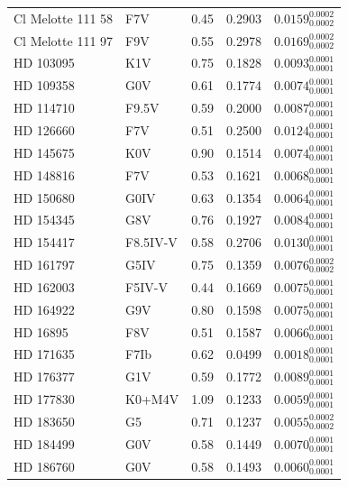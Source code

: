 \begin{appendices}
\begin{longtable}{llccc}
Cl Melotte 111 58 & F7V           & 0.45 & 0.2903        & $0.0159^{0.0002}_{0.0002}$ \\
Cl Melotte 111 97 & F9V           & 0.55 & 0.2978        & $0.0169^{0.0002}_{0.0002}$ \\
HD 103095         & K1V           & 0.75 & 0.1828        & $0.0093^{0.0001}_{0.0001}$ \\
HD 109358         & G0V           & 0.61 & 0.1774        & $0.0074^{0.0001}_{0.0001}$ \\
HD 114710         & F9.5V         & 0.59 & 0.2000        & $0.0087^{0.0001}_{0.0001}$ \\
HD 126660         & F7V           & 0.51 & 0.2500        & $0.0124^{0.0001}_{0.0001}$ \\
HD 145675         & K0V           & 0.90 & 0.1514        & $0.0074^{0.0001}_{0.0001}$ \\
HD 148816         & F7V           & 0.53 & 0.1621        & $0.0068^{0.0001}_{0.0001}$ \\
HD 150680         & G0IV          & 0.63 & 0.1354        & $0.0064^{0.0001}_{0.0001}$ \\
HD 154345         & G8V           & 0.76 & 0.1927        & $0.0084^{0.0001}_{0.0001}$ \\
HD 154417         & F8.5IV-V      & 0.58 & 0.2706        & $0.0130^{0.0001}_{0.0001}$ \\
HD 161797         & G5IV          & 0.75 & 0.1359        & $0.0076^{0.0002}_{0.0002}$ \\
HD 162003         & F5IV-V        & 0.44 & 0.1669        & $0.0075^{0.0001}_{0.0001}$ \\
HD 164922         & G9V           & 0.80 & 0.1598        & $0.0075^{0.0001}_{0.0001}$ \\
HD 16895          & F8V           & 0.51 & 0.1587        & $0.0066^{0.0001}_{0.0001}$ \\
HD 171635         & F7Ib          & 0.62 & 0.0499        & $0.0018^{0.0001}_{0.0001}$ \\
HD 176377         & G1V           & 0.59 & 0.1772        & $0.0089^{0.0001}_{0.0001}$ \\
HD 177830         & K0+M4V        & 1.09 & 0.1233        & $0.0059^{0.0001}_{0.0001}$ \\
HD 183650         & G5            & 0.71 & 0.1237        & $0.0055^{0.0002}_{0.0002}$ \\
HD 184499         & G0V           & 0.58 & 0.1449        & $0.0070^{0.0001}_{0.0001}$ \\
HD 186760         & G0V           & 0.58 & 0.1493        & $0.0060^{0.0001}_{0.0001}$ \\

\end{longtable}
\end{appendices}
